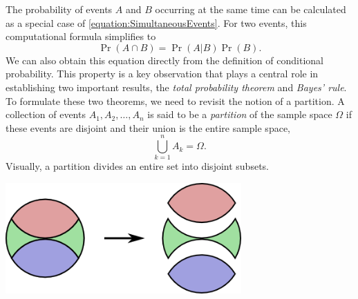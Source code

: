 The probability of events $A$ and $B$ occurring at the same time can be calculated as a special case of \eqref{equation:SimultaneousEvents}.
For two events, this computational formula simplifies to
\begin{equation} \label{equation:ProbabilityIntersection}
\Pr (A \cap B) = \Pr (A|B) \Pr (B) .
\end{equation}
We can also obtain this equation directly from the definition of conditional probability.
This property is a key observation that plays a central role in establishing two important results, the \emph{total probability theorem} and \emph{Bayes' rule}.
To formulate these two theorems, we need to revisit the notion of a partition.
A collection of events $A_1, A_2, \ldots, A_n$ is said to be a \emph{partition} of the sample space $\Omega$ if these events are disjoint and their union is the entire sample space, 
\begin{equation*}
\bigcup_{k=1}^n A_k = \Omega .
\end{equation*}
Visually, a partition divides an entire set into disjoint subsets.
\begin{center}
\includegraphics[height=4.23cm]{Figures/3Chapter/setpartition2}
\end{center}

